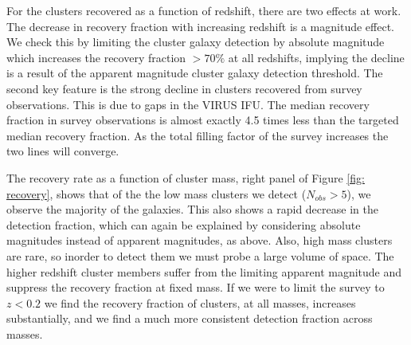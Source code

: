 \documentclass[fleqn,usenatbib]{mnras}
\begin{document}
For the clusters recovered as a function of redshift, there are two effects at work. The decrease in recovery fraction with increasing redshift is a magnitude effect. We check this by limiting the cluster galaxy detection by absolute magnitude which increases the recovery fraction $>70\%$ at all redshifts, implying the decline is a result of the apparent magnitude cluster galaxy detection threshold. The second key feature is the strong decline in clusters recovered from survey observations. This is due to gaps in the VIRUS IFU. The median recovery fraction in survey observations is almost exactly 4.5 times less than the targeted median recovery fraction. As the total filling factor of the survey increases the two lines will converge.

The recovery rate as a function of cluster mass, right panel of Figure \ref{fig: recovery}, shows that of the the low mass clusters we detect ($N_{obs} >5$), we observe the majority of the galaxies. This also shows a rapid decrease in the detection fraction, which can again be explained by considering absolute magnitudes instead of apparent magnitudes, as above. Also, high mass clusters are rare, so inorder to detect them we must probe a large volume of space. The higher redshift cluster members suffer from the limiting apparent magnitude and suppress the recovery fraction at fixed mass. If we were to limit the survey to $z<0.2$ we find the recovery fraction of clusters, at all masses, increases substantially, and we find a much more consistent detection fraction across masses.
\end{document}
